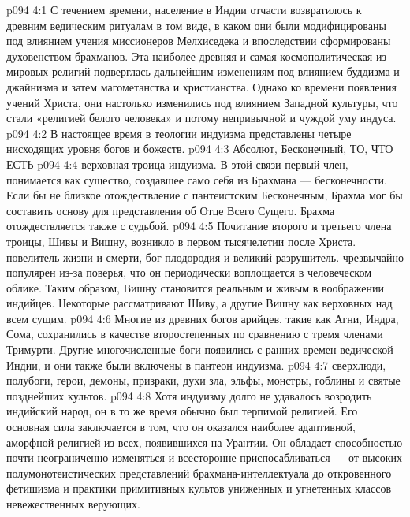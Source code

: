 \vs p094 4:1 С течением времени, население в Индии отчасти возвратилось к древним ведическим ритуалам в том виде, в каком они были модифицированы под влиянием учения миссионеров Мелхиседека и впоследствии сформированы духовенством брахманов. Эта наиболее древняя и самая космополитическая из мировых религий подверглась дальнейшим изменениям под влиянием буддизма и джайнизма и затем магометанства и христианства. Однако ко времени появления учений Христа, они настолько изменились под влиянием Западной культуры, что стали «религией белого человека» и потому непривычной и чуждой уму индуса.
\vs p094 4:2 \pc В настоящее время в теологии индуизма представлены четыре нисходящих уровня богов и божеств.
\vs p094 4:3 \bibnobreakspace {} Абсолют, Бесконечный, ТО, ЧТО ЕСТЬ
\vs p094 4:4 \bibnobreakspace {} верховная троица индуизма. В этой связи первый член,  понимается как существо, создавшее само себя из Брахмана --- бесконечности. Если бы не близкое отождествление с пантеистским Бесконечным, Брахма мог бы составить основу для представления об Отце Всего Сущего. Брахма отождествляется также с судьбой.
\vs p094 4:5 Почитание второго и третьего члена троицы, Шивы и Вишну, возникло в первом тысячелетии после Христа.  повелитель жизни и смерти, бог плодородия и великий разрушитель.  чрезвычайно популярен из\hyp{}за поверья, что он периодически воплощается в человеческом облике. Таким образом, Вишну становится реальным и живым в воображении индийцев. Некоторые рассматривают Шиву, а другие Вишну как верховных над всем сущим.
\vs p094 4:6 \bibnobreakspace {} Многие из древних богов арийцев, такие как Агни, Индра, Сома, сохранились в качестве второстепенных по сравнению с тремя членами Тримурти. Другие многочисленные боги появились с ранних времен ведической Индии, и они также были включены в пантеон индуизма.
\vs p094 4:7 \bibnobreakspace {} сверхлюди, полубоги, герои, демоны, призраки, духи зла, эльфы, монстры, гоблины и святые позднейших культов.
\vs p094 4:8 \pc Хотя индуизму долго не удавалось возродить индийский народ, он в то же время обычно был терпимой религией. Его основная сила заключается в том, что он оказался наиболее адаптивной, аморфной религией из всех, появившихся на Урантии. Он обладает способностью почти неограниченно изменяться и всесторонне приспосабливаться --- от высоких полумонотеистических представлений брахмана\hyp{}интеллектуала до откровенного фетишизма и практики примитивных культов униженных и угнетенных классов невежественных верующих.

